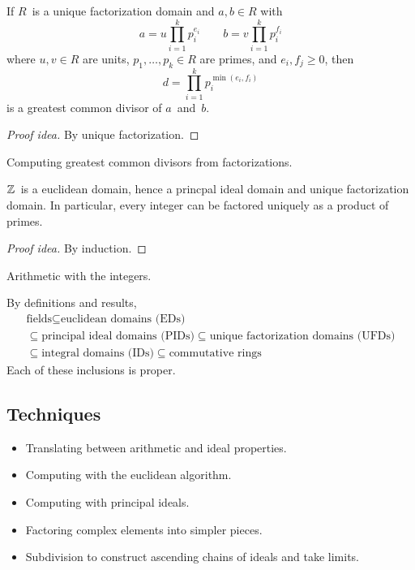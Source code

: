 \begin{thm}
If \(R\)~is a unique factorization domain and \(a,b\in R\) with
\[a=u\prod_{i=1}^k p_i^{e_i}\qquad b=v\prod_{i=1}^k p_i^{f_i}\]
where \(u,v\in R\) are units, \(p_1,\ldots,p_k\in R\) are primes, and \(e_i,f_j\ge0\), then
\[d=\prod_{i=1}^k p_i^{\min(e_i,f_i)}\]
is a greatest common divisor of \(a\)~and~\(b\).
\end{thm}
\begin{proof}[Proof idea]
By unique factorization.
\end{proof}
\begin{app}
Computing greatest common divisors from factorizations.
\end{app}

\begin{thm}
\(\mathbb{Z}\)~is a euclidean domain, hence a princpal ideal domain and unique factorization domain. In particular, every integer can be factored uniquely as a product of primes.
\end{thm}
\begin{proof}[Proof idea]
By induction.
\end{proof}
\begin{app}
Arithmetic with the integers.
\end{app}

\begin{rmk}
By definitions and results,
\begin{multline*}
\text{fields}\subseteq\text{euclidean domains (EDs)}\\
\subseteq\text{principal ideal domains (PIDs)}\subseteq\text{unique factorization domains (UFDs)}\\
\subseteq\text{integral domains (IDs)}\subseteq\text{commutative rings}
\end{multline*}
Each of these inclusions is proper.
\end{rmk}

\subsection*{Techniques}
\begin{itemize}[itemsep=0pt]
\item Translating between arithmetic and ideal properties.
\item Computing with the euclidean algorithm.
\item Computing with principal ideals.
\item Factoring complex elements into simpler pieces.
\item Subdivision to construct ascending chains of ideals and take limits.
\end{itemize}
